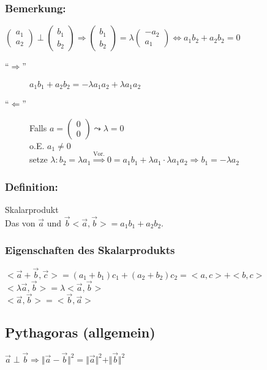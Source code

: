 \subsubsection{Bemerkung:}
$\begin{pmatrix} a_{1} \\ a_{2} \end{pmatrix} \perp \begin{pmatrix} b_{1} \\ b_{2} \end{pmatrix} \Rightarrow \begin{pmatrix} b_{1} \\ b_{2} \end{pmatrix} = \lambda \begin{pmatrix} -a_{2} \\ a_{1} \end{pmatrix} \Leftrightarrow a_{1}b_{2}+a_{2}b_{2}=0$
\begin{description}
	\item["`$\Rightarrow$"'] $a_{1}b_{1}+a_{2}b_{2}= -\lambda a_{1}a_{2} + \lambda 
		a_{1}a_{2}$
	\item["`$\Leftarrow$"'] Falls $ a = \begin{pmatrix} 0 \\ 0 \end{pmatrix} \leadsto 
		\lambda = 0$ \\ 
		o.E. $a_{1} \neq 0 $ \\
		setze $\lambda: b_{2} = \lambda a_{1} \mathop{\Rightarrow}\limits^{\text{Vor.}} 
		0 = a_{1}b_{1}+\lambda a_{1}\cdot\lambda a_{1}a_{2} \Rightarrow b_{1} = - 
		\lambda a_{2}$
\end{description}
%
%
%
\subsubsection{Definition:}
Skalarprodukt\\
Das von $\vec{a}$ und $\vec{b} <\vec{a},\vec{b}> = a_{1}b_{1}+a_{2}b_{2}$.
%
%
%
\subsubsection{Eigenschaften des Skalarprodukts}
$<\vec{a}+\vec{b},\vec{c}>=(a_{1}+b_{1})c_{1}+(a_{2}+b_{2})c_{2}=<a,c>+<b,c>$\\
$<\lambda \vec{a},\vec{b}>=\lambda <\vec{a},\vec{b}>$\\
$<\vec{a},\vec{b}>=<\vec{b},\vec{a}>$
%
%
%
\subsection{Pythagoras (allgemein)}
$\vec{a}\perp\vec{b} \Rightarrow \Vert \vec{a} - \vec{b} \Vert^{2} = \Vert \vec{a} \Vert^{2} + \Vert \vec{b} \Vert ^{2}$
%
%
%
